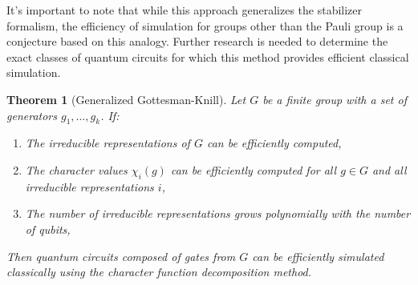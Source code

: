 \documentclass[11pt,a4paper]{article}
\newtheorem{theorem}{Theorem}
\begin{document}
It's important to note that while this approach generalizes the stabilizer formalism, the efficiency of simulation for groups other than the Pauli group is a conjecture based on this analogy. Further research is needed to determine the exact classes of quantum circuits for which this method provides efficient classical simulation.
\begin{theorem}[Generalized Gottesman-Knill]
Let $G$ be a finite group with a set of generators ${g_1, \ldots, g_k}$. If:
\begin{enumerate}
\item The irreducible representations of $G$ can be efficiently computed,
\item The character values $\chi_i(g)$ can be efficiently computed for all $g \in G$ and all irreducible representations $i$,
\item The number of irreducible representations grows polynomially with the number of qubits,
\end{enumerate}
Then quantum circuits composed of gates from $G$ can be efficiently simulated classically using the character function decomposition method.
\end{theorem}
\end{document}
